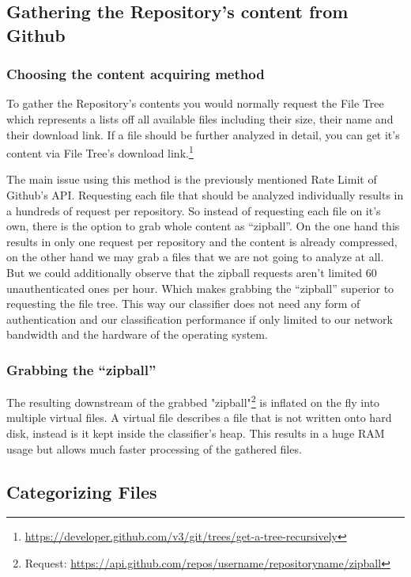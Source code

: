 \documentclass[paper=A4,pagesize=auto,11pt,headinclude=true,footinclude=true,BCOR=0mm,DIV=calc]{scrartcl}
\begin{document}
	\subsection{Gathering the Repository’s content from Github}
	
	\subsubsection{Choosing the content acquiring method}
	
	To gather the Repository’s contents you would normally request the File Tree which represents a lists off all available files including their size, their name and their download link. If a file should be further analyzed in detail, you can get it’s content via File Tree’s download link.\footnote{\url{	https://developer.github.com/v3/git/trees/get-a-tree-recursively}}
	
	The main issue using this method is the previously mentioned Rate Limit of Github’s API. Requesting each file that should be analyzed individually results in a hundreds of request per repository.
	So instead of requesting each file on it’s own, there is the option to grab whole content as “zipball”. On the one hand this results in only one request per repository and the content is already compressed, on the other hand we may grab a files that we are not going to analyze at all. 
	But we could  additionally observe that the zipball requests aren’t limited 60 unauthenticated ones per hour. Which makes grabbing the “zipball” superior to requesting the file tree. This way our classifier does not need any form of authentication and our classification performance if only limited to our network bandwidth and the hardware of the operating system.
	
	\subsubsection{ Grabbing the “zipball”}
	
	
	The resulting downstream of the grabbed "zipball"\footnote{Request: \url{https://api.github.com/repos/username/repositoryname/zipball}} is inflated on the fly into multiple virtual files. A virtual file describes a file that is not written onto hard disk, instead is it kept inside the classifier’s heap. This results in a huge RAM usage but allows much faster processing of the gathered files.
	
	\subsection{Categorizing Files}
	
\end{document}

